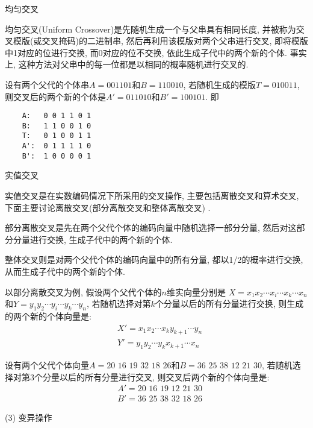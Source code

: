  均匀交叉

均匀交叉(Uniform Crossover)是先随机生成一个与父串具有相同长度, 并被称为交叉模版(或交叉掩码)的二进制串, 然后再利用该模版对两个父串进行交叉, 即将模版中1对应的位进行交换, 而0对应的位不交换, 依此生成子代中的两个新的个体.
事实上, 这种方法对父串中的每一位都是以相同的概率随机进行交叉的.

\begin{example}
设有两个父代的个体串$A=001101$和$B=110010$, 若随机生成的模版$T=010011$, 则交叉后的两个新的个体是$A'=011010$和$B'=100101$. 即
\begin{Verbatim}
    A:   0 0 1 1 0 1
    B:   1 1 0 0 1 0
    T:   0 1 0 0 1 1
    A':  0 1 1 1 1 0
    B':  1 0 0 0 0 1
\end{Verbatim}

     实值交叉
\end{example}

实值交叉是在实数编码情况下所采用的交叉操作, 主要包括离散交叉和算术交叉, 下面主要讨论离散交叉(部分离散交叉和整体离散交叉) .

部分离散交叉是先在两个父代个体的编码向量中随机选择一部分分量, 然后对这部分分量进行交换, 生成子代中的两个新的个体.

整体交叉则是对两个父代个体的编码向量中的所有分量, 都以1/2的概率进行交换, 从而生成子代中的两个新的个体.

以部分离散交叉为例, 假设两个父代个体的$n$维实向量分别是 $X=x_1x_2\cdots x_i\cdots x_k\cdots x_n$和$Y=y_1 y_2\cdots y_i \cdots y_k \cdots y_n$, 若随机选择对第$k$个分量以后的所有分量进行交换, 则生成的两个新的个体向量是:
\begin{align}
  &X'= x_1 x_2 \cdots x_k y_{k+1} \cdots y_n\\
  &Y'= y_1 y_2 \cdots y_k x_{k+1} \cdots x_n
\end{align}

\begin{example}
设有两个父代个体向量$A=20\,\,  16\,\,  19\,\,  32 \,\, 18 \,\, 26$和$B=36\,\,  25\,\,  38\,\,  12\,\,  21\,\,  30$, 若随机选择对第3个分量以后的所有分量进行交叉, 则交叉后两个新的个体向量是:
\begin{align}
  &A'= 20\,\, 16\,\,  19\,\,  12\,\,  21\,\,  30\\
  &B'= 36\,\,  25\,\,  38\,\,  32\,\,  18\,\,  26
\end{align}

\end{example}

 (3) 变异操作

